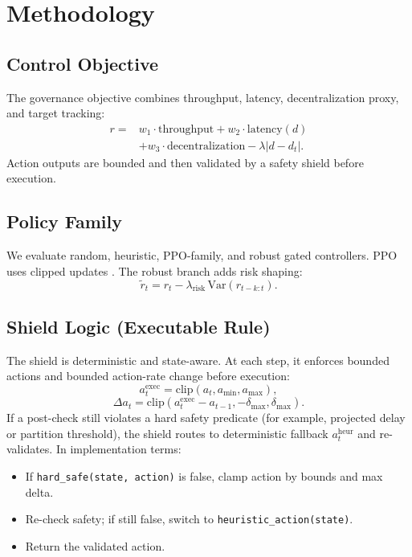 \section{Methodology}

\subsection{Control Objective}

The governance objective combines throughput, latency, decentralization proxy, and target tracking:
\[
\begin{aligned}
r ={}& w_1 \cdot \text{throughput} + w_2 \cdot \text{latency}(d) \\
&+ w_3 \cdot \text{decentralization} - \lambda |d - d_t|.
\end{aligned}
\]
Action outputs are bounded and then validated by a safety shield before execution.

\subsection{Policy Family}

We evaluate random, heuristic, PPO-family, and robust gated controllers. PPO uses clipped updates \cite{schulman2017ppo}. The robust branch adds risk shaping:
\[
\tilde r_t = r_t - \lambda_{\mathrm{risk}}\,\mathrm{Var}(r_{t-k:t}).
\]

\subsection{Shield Logic (Executable Rule)}

The shield is deterministic and state-aware. At each step, it enforces bounded actions and bounded action-rate change before execution:
\[
a^{\mathrm{exec}}_t=\mathrm{clip}(a_t, a_{\min}, a_{\max}),
\]
\[
\Delta a_t=\mathrm{clip}(a^{\mathrm{exec}}_t-a_{t-1},-\delta_{\max},\delta_{\max}).
\]
If a post-check still violates a hard safety predicate (for example, projected delay or partition threshold), the shield routes to deterministic fallback $a_t^{\mathrm{heur}}$ and re-validates. In implementation terms:
\begin{itemize}
    \item If \texttt{hard\_safe(state, action)} is false, clamp action by bounds and max delta.
    \item Re-check safety; if still false, switch to \texttt{heuristic\_action(state)}.
    \item Return the validated action.
\end{itemize}

